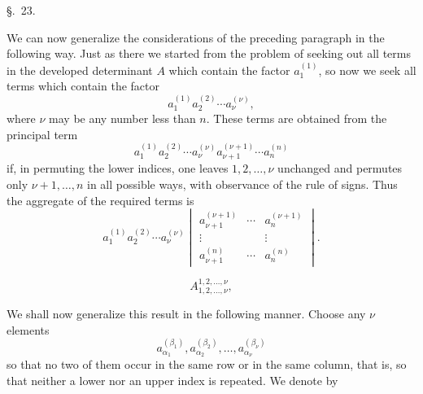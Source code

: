 
\begin{center}
{\large \S.\ 23.}

\vspace{0.5em}
{\large{}}
\end{center}

We can now generalize the considerations of the preceding paragraph in the following way.  Just as there we started from the problem of seeking out all terms in the developed determinant \(A\) which contain the factor \(a_1^{(1)}\), so now we seek all terms which contain the factor
\[
        a_1^{(1)}a_2^{(2)}\cdots a_\nu^{(\nu)},
\]
where \(\nu\) may be any number less than \(n\).  These terms are obtained from the principal term
\[
        a_1^{(1)}a_2^{(2)}\cdots a_\nu^{(\nu)}a_{\nu+1}^{(\nu+1)}\cdots a_n^{(n)}
\]
if, in permuting the lower indices, one leaves \(1,2,\ldots,\nu\) unchanged and permutes only \(\nu+1,\ldots,n\) in all possible ways, with observance of the rule of signs.  Thus the aggregate of the required terms is
\begin{equation}
        a_1^{(1)}a_2^{(2)}\cdots a_\nu^{(\nu)}
        \begin{vmatrix}
        a_{\nu+1}^{(\nu+1)}&\cdots&a_n^{(\nu+1)}\\
        \vdots&&\vdots\\
        a_{\nu+1}^{(n)}&\cdots&a_n^{(n)}
        \end{vmatrix}.
\tag{1}
\end{equation}

\[
        A_{1,2,\ldots,\nu}^{1,2,\ldots,\nu},
\]

We shall now generalize this result in the following manner.  Choose any \(\nu\) elements
\[
        a_{\alpha_1}^{(\beta_1)},
        a_{\alpha_2}^{(\beta_2)},\ldots,
        a_{\alpha_\nu}^{(\beta_\nu)}
\]
so that no two of them occur in the same row or in the same column, that is, so that neither a lower nor an upper index is repeated.  We denote by
